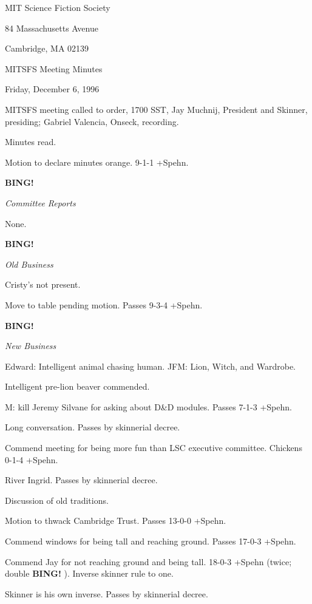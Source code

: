 \documentclass[12pt]{article}
\newcommand{\bing}{{\bf BING!} }
\newcommand{\goto}[1]{\bing \vskip 12pt \centerline{{\em{#1}}}}
\begin{document}
\begin{center}

MIT Science Fiction Society 

84 Massachusetts Avenue

Cambridge, MA 02139

\vspace{12pt}

MITSFS Meeting Minutes 

Friday, December 6, 1996

\end{center}
 
\vspace{18pt}

\setlength{\parskip}{6pt}

\noindent
MITSFS meeting called to order, 1700 SST,
Jay Muchnij, President and Skinner, presiding; Gabriel Valencia, Onseck, recording.

Minutes read.

Motion to declare minutes orange. 9-1-1 +Spehn.

\goto{Committee Reports}

None.

\goto{Old Business}

Cristy's not present.

Move to table pending motion. Passes 9-3-4 +Spehn.

\goto{New Business}

Edward: Intelligent animal chasing human. JFM: Lion, Witch, and Wardrobe.

Intelligent pre-lion beaver commended.

M: kill Jeremy Silvane for asking about D&D modules. Passes 7-1-3 +Spehn.

Long conversation. Passes by skinnerial decree.

Commend meeting for being more fun than LSC executive committee. Chickens 0-1-4 +Spehn.

River Ingrid. Passes by skinnerial decree.

Discussion of old traditions.

Motion to thwack Cambridge Trust. Passes 13-0-0 +Spehn.

Commend windows for being tall and reaching ground. Passes 17-0-3 +Spehn.

Commend Jay for not reaching ground and being tall. 18-0-3 +Spehn (twice; double \bing). Inverse skinner rule to one.

Skinner is his own inverse. Passes by skinnerial decree.
\end{document}
